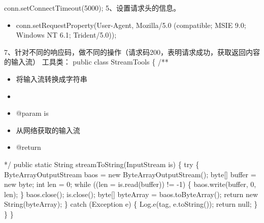 \documentclass[9pt, b5paper]{article}
\begin{document}
conn.setConnectTimeout(5000);
5、设置请求头的信息。
\begin{itemize}
\item conn.setRequestProperty(User-Agent, Mozilla/5.0 (compatible; MSIE 9.0; Windows NT 6.1; Trident/5.0));
\end{itemize}
7、针对不同的响应码，做不同的操作（请求码200，表明请求成功，获取返回内容的输入流）
工具类：
public class StreamTools \{
    /**
\begin{itemize}
\item 将输入流转换成字符串
\item 
\item @param is
\item 从网络获取的输入流
\item @return
\end{itemize}
     */
    public static String streamToString(InputStream is) \{
        try \{
            ByteArrayOutputStream baos = new ByteArrayOutputStream();
            byte[] buffer = new byte\footnotemark[1]{};
            int len = 0;
            while ((len = is.read(buffer)) != -1) \{
                baos.write(buffer, 0, len);
            \}
            baos.close();
            is.close();
            byte[] byteArray = baos.toByteArray();
            return new String(byteArray);
        \} catch (Exception e) \{
            Log.e(tag, e.toString());
            return null;
        \}
    \}
\}
\end{document}
